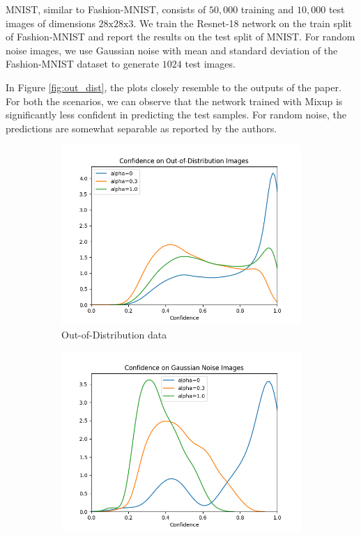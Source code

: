 MNIST, similar to Fashion-MNIST, consists of $50,000$ training and $10,000$ test images of dimensions $28\text{x}28\text{x}3$. We train the Resnet-18 network on the train split of Fashion-MNIST and report the results on the test split of MNIST. For random noise images, we use Gaussian noise with mean and standard deviation of the Fashion-MNIST dataset to generate $1024$ test images. 

In Figure \ref{fig:out_dist}, the plots closely resemble to the outputs of the paper. For both the scenarios, we can observe that the network trained with Mixup is significantly less confident in predicting the test samples. For random noise, the predictions are somewhat separable as reported by the authors. 
\begin{figure}[h]
     \centering
     \begin{subfigure}[b]{0.45\textwidth}
         \centering
         \includegraphics[width=\textwidth]{images/ood/distplot.png}
         \caption{Out-of-Distribution data}
     \end{subfigure}
     \begin{subfigure}[b]{0.45\textwidth}
         \centering
         \includegraphics[width=\textwidth]{images/noise/distplot.png}

\end{subfigure}
\end{figure}
